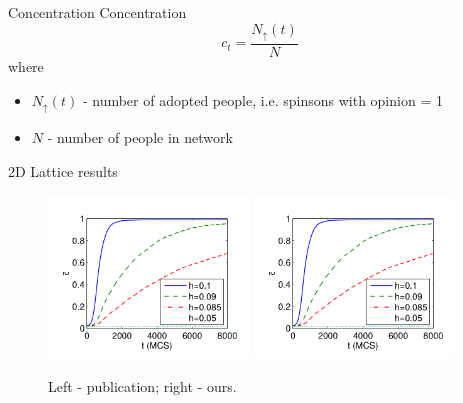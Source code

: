 \documentclass[10pt]{beamer}
\begin{document}
\begin{frame}{Concentration}
	Concentration
	$$ c_t = \frac{N_{\uparrow}(t)}{N} $$ 
	where 
	\begin{itemize}
		\item $ N_{\uparrow}(t) $ - number of adopted people, i.e. spinsons with opinion = 1
		\item $ N $ - number of people in network
	\end{itemize}

\end{frame}

\begin{frame}{2D Lattice results}
	\begin{figure}
		\includegraphics[width=0.475\textwidth]{../resources/images/fig7-left.png}
		\hfill
		\includegraphics[width=0.475\textwidth]{../resources/images/fig7-left.png}
		\caption{Left - publication; right - ours.}
	\end{figure}
\end{frame}
\end{document}
